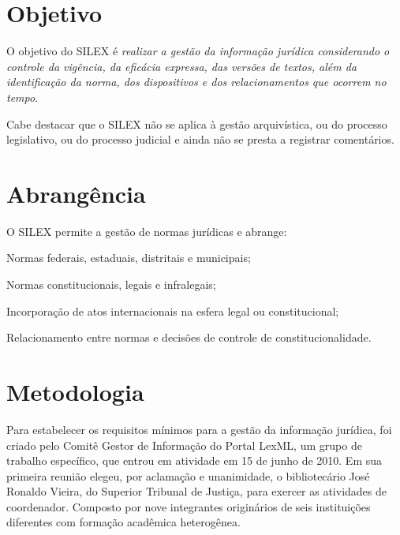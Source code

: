 \documentclass[a4paper,11pt,openright,twoside,english,brazil]{abntex2}
\begin{document}
\section{Objetivo}


O objetivo do SILEX é \emph{realizar a gestão da informação jurídica
considerando o controle da vigência, da eficácia expressa, das versões de
textos, além da identificação da norma, dos dispositivos e dos relacionamentos
que ocorrem no tempo}.

Cabe destacar que o SILEX não se aplica à gestão arquivística, ou do processo
legislativo, ou do processo judicial e ainda não se presta a registrar
comentários.

\section{Abrangência}

O SILEX permite a gestão de normas jurídicas e abrange:

\begin{alineas}
 \item Normas federais, estaduais, distritais e municipais;
 \item Normas constitucionais, legais e infralegais;
 \item Incorporação de atos internacionais na esfera legal ou constitucional;
 \item Relacionamento entre normas e decisões de controle de
 constitucionalidade.
\end{alineas}

\section{Metodologia}

Para estabelecer os requisitos mínimos para a gestão da informação jurídica, foi
criado pelo Comitê Gestor de Informação do Portal LexML, um grupo de trabalho
específico, que entrou em atividade em 15 de junho de 2010. Em sua primeira
reunião elegeu, por aclamação e unanimidade, o bibliotecário José Ronaldo
Vieira, do Superior Tribunal de Justiça, para exercer as atividades de
coordenador. Composto por nove integrantes originários de seis instituições
diferentes com formação acadêmica heterogênea.
\end{document}
